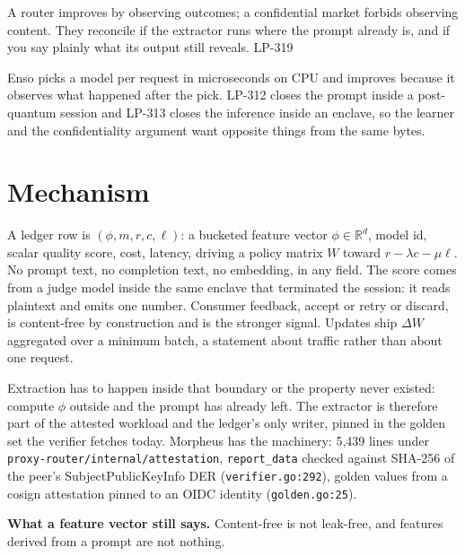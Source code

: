 \documentclass[10pt,a4paper]{article}
\newcommand{\code}[1]{\texttt{\small #1}}
\begin{document}
%
{A router improves by observing outcomes; a confidential market forbids observing content. They
reconcile if the extractor runs where the prompt already is, and if you say plainly what its
output still reveals.}%
{LP-319}

Enso picks a model per request in microseconds on CPU and improves because it observes what
happened after the pick. LP-312 closes the prompt inside a post-quantum session and LP-313
closes the inference inside an enclave, so the learner and the confidentiality argument want
opposite things from the same bytes.

\section*{Mechanism}

A ledger row is $(\phi, m, r, c, \ell)$: a bucketed feature vector $\phi \in \mathbb{R}^{d}$,
model id, scalar quality score, cost, latency, driving a policy matrix $W$ toward
$r - \lambda c - \mu \ell$. No prompt text, no completion text, no embedding, in any field. The
score comes from a judge model inside the same enclave that terminated the session: it reads
plaintext and emits one number. Consumer feedback, accept or retry or discard, is content-free
by construction and is the stronger signal. Updates ship $\Delta W$ aggregated over a minimum
batch, a statement about traffic rather than about one request.

Extraction has to happen inside that boundary or the property never existed: compute $\phi$
outside and the prompt has already left. The extractor is therefore part of the attested
workload and the ledger's only writer, pinned in the golden set the verifier fetches today.
Morpheus has the machinery: 5{,}439 lines under
\code{proxy-router/internal/attestation}, \code{report\_data} checked against SHA-256 of the
peer's SubjectPublicKeyInfo DER (\code{verifier.go:292}), golden values from a cosign
attestation pinned to an OIDC identity (\code{golden.go:25}).

\vspace{0.4ex}
\noindent\textbf{What a feature vector still says.} Content-free is not leak-free, and features
derived from a prompt are not nothing.
\end{document}
